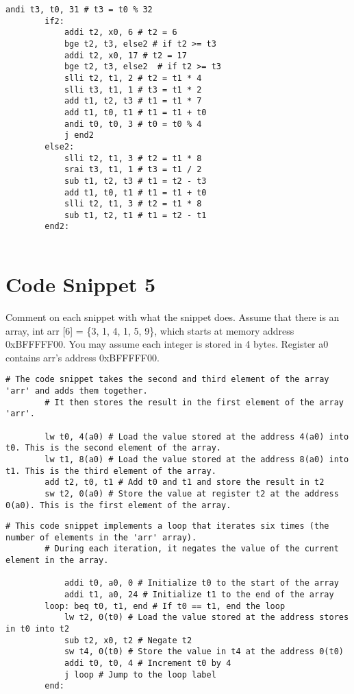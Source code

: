 \documentclass[12pt]{article}
\begin{document}
    \begin{lstlisting}[language=RISCV]
        andi t3, t0, 31 # t3 = t0 % 32
        if2:
            addi t2, x0, 6 # t2 = 6 
            bge t2, t3, else2 # if t2 >= t3
            addi t2, x0, 17 # t2 = 17
            bge t2, t3, else2  # if t2 >= t3
            slli t2, t1, 2 # t2 = t1 * 4
            slli t3, t1, 1 # t3 = t1 * 2
            add t1, t2, t3 # t1 = t1 * 7
            add t1, t0, t1 # t1 = t1 + t0
            andi t0, t0, 3 # t0 = t0 % 4
            j end2
        else2:
            slli t2, t1, 3 # t2 = t1 * 8
            srai t3, t1, 1 # t3 = t1 / 2
            sub t1, t2, t3 # t1 = t2 - t3
            add t1, t0, t1 # t1 = t1 + t0
            slli t2, t1, 3 # t2 = t1 * 8
            sub t1, t2, t1 # t1 = t2 - t1
        end2:
        
    \end{lstlisting}

    \newpage
    \section{Code Snippet 5}
    \begin{flushleft}
        Comment on each snippet with what the snippet does. Assume that there is an
        array, int arr [6] = \{3, 1, 4, 1, 5, 9\}, which starts at memory address
        0xBFFFFF00. You may assume each integer is stored in 4 bytes. Register a0 contains
        arr's address 0xBFFFFF00.
    \end{flushleft}
    \begin{lstlisting}[language=RISCV]
        # The code snippet takes the second and third element of the array 'arr' and adds them together.
        # It then stores the result in the first element of the array 'arr'.

        lw t0, 4(a0) # Load the value stored at the address 4(a0) into t0. This is the second element of the array.
        lw t1, 8(a0) # Load the value stored at the address 8(a0) into t1. This is the third element of the array.
        add t2, t0, t1 # Add t0 and t1 and store the result in t2
        sw t2, 0(a0) # Store the value at register t2 at the address 0(a0). This is the first element of the array.
    \end{lstlisting}

    \begin{lstlisting}[language=RISCV]
        # This code snippet implements a loop that iterates six times (the number of elements in the 'arr' array). 
        # During each iteration, it negates the value of the current element in the array.

            addi t0, a0, 0 # Initialize t0 to the start of the array
            addi t1, a0, 24 # Initialize t1 to the end of the array
        loop: beq t0, t1, end # If t0 == t1, end the loop
            lw t2, 0(t0) # Load the value stored at the address stores in t0 into t2
            sub t2, x0, t2 # Negate t2
            sw t4, 0(t0) # Store the value in t4 at the address 0(t0)
            addi t0, t0, 4 # Increment t0 by 4
            j loop # Jump to the loop label
        end:
    \end{lstlisting}
\end{document}
